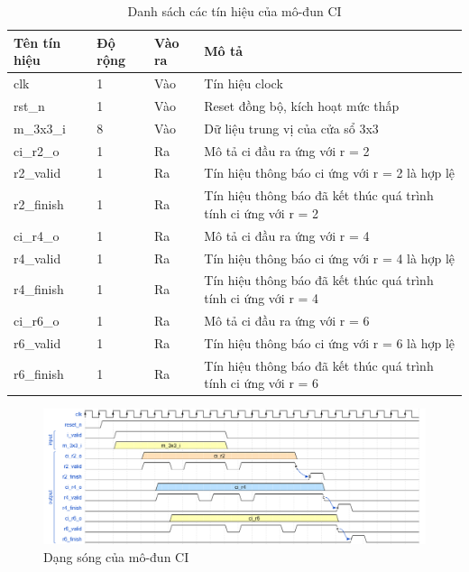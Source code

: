 \begin{table}[!ht]
    \centering
    \renewcommand{\arraystretch}{1.3} %
        \caption{Danh sách các tín hiệu của mô-đun CI}
    \begin{tabular}{|p{3cm} p{2cm} p{2cm} p{8cm}|}
        \hline
        \rowcolor{gray!30}
        \textbf{Tên tín hiệu} & \textbf{Độ rộng} & \textbf{Vào ra} & \textbf{Mô tả} \\
        \hline
        clk & 1 & Vào & Tín hiệu clock \\
        \hline
        rst\_n & 1 & Vào & Reset đồng bộ, kích hoạt mức thấp \\
        \hline 
        m\_3x3\_i & 8 & Vào & Dữ liệu trung vị của cửa sổ 3x3
        \\ \hline
        ci\_r2\_o & 1 & Ra & Mô tả ci đầu ra ứng với r = 2
        \\ \hline
        r2\_valid & 1 & Ra & Tín hiệu thông báo ci ứng với r = 2 là hợp lệ
        \\ \hline
        r2\_finish & 1 & Ra & Tín hiệu thông báo đã kết thúc quá trình tính ci ứng với r = 2
        \\ \hline
                ci\_r4\_o & 1 & Ra & Mô tả ci đầu ra ứng với r = 4
        \\ \hline
        r4\_valid & 1 & Ra & Tín hiệu thông báo ci ứng với r = 4 là hợp lệ
        \\ \hline
        r4\_finish & 1 & Ra & Tín hiệu thông báo đã kết thúc quá trình tính ci ứng với r = 4
        \\ \hline
                ci\_r6\_o & 1 & Ra & Mô tả ci đầu ra ứng với r = 6
        \\ \hline
        r6\_valid & 1 & Ra & Tín hiệu thông báo ci ứng với r = 6 là hợp lệ
        \\ \hline
        r6\_finish & 1 & Ra & Tín hiệu thông báo đã kết thúc quá trình tính ci ứng với r = 6
        \\ \hline
       
    \end{tabular}

    \label{tab:signalListCI}
\end{table}

\begin{figure}[!ht]
    \centering
    \includegraphics[width=\linewidth]{figures/ci.png}
    \caption{Dạng sóng của mô-đun CI}
    \label{fig:ci}
\end{figure}

